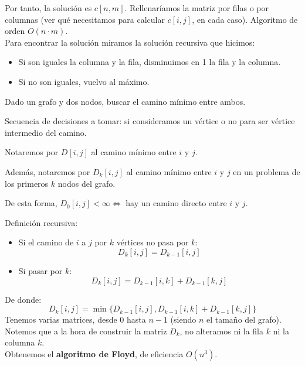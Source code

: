 \begin{ejemplo}
    Por tanto, la solución es $c[n,m]$. Rellenaríamos la matriz por filas o por columnas (ver qué necesitamos para calcular $c[i,j]$, en cada caso). Algoritmo de orden $O(n\cdot m)$.\\

    Para encontrar la solución miramos la solución recursiva que hicimos:
    \begin{itemize}
        \item Si son iguales la columna y la fila, disminuimos en 1 la fila y la columna.
        \item Si no son iguales, vuelvo al máximo.
    \end{itemize}
\end{ejemplo}

\begin{ejemplo}
Dado un grafo y dos nodos, buscar el camino mínimo entre ambos.

Secuencia de decisiones a tomar: si consideramos un vértice o no para ser vértice intermedio del camino.

\begin{notacion}
    Notaremos por $D[i,j]$ al camino mínimo entre $i$ y $j$. 

    Además, notaremos por $D_k[i,j]$ al camino mínimo entre $i$ y $j$ en un problema de los primeros $k$ nodos del grafo.
\end{notacion}
De esta forma, $D_0[i,j]<\infty \Longleftrightarrow $ hay un camino directo entre $i$ y $j$.

Definición recursiva:
\begin{itemize}
    \item Si el camino de $i$ a $j$ por $k$ vértices no pasa por $k$:
        \begin{equation*}
            D_k[i,j] = D_{k-1}[i,j]
        \end{equation*}
    \item Si pasar por $k$:
        \begin{equation*}
            D_k[i,j] = D_{k-1}[i,k] + D_{k-1}[k,j]
        \end{equation*}
\end{itemize}
De donde:
\begin{equation*}
    D_k[i,j] = \min \{D_{k-1}[i,j], D_{k-1}[i,k] + D_{k-1}[k,j]\}
\end{equation*}
Tenemos varias matrices, desde 0 hasta $n-1$ (siendo $n$ el tamaño del grafo). Notemos que a la hora de construir la matriz $D_k$, no alteramos ni la fila $k$ ni la columna $k$.\\

Obtenemos el \textbf{algoritmo de Floyd}, de eficiencia $O(n^3)$.
    
\end{ejemplo}

